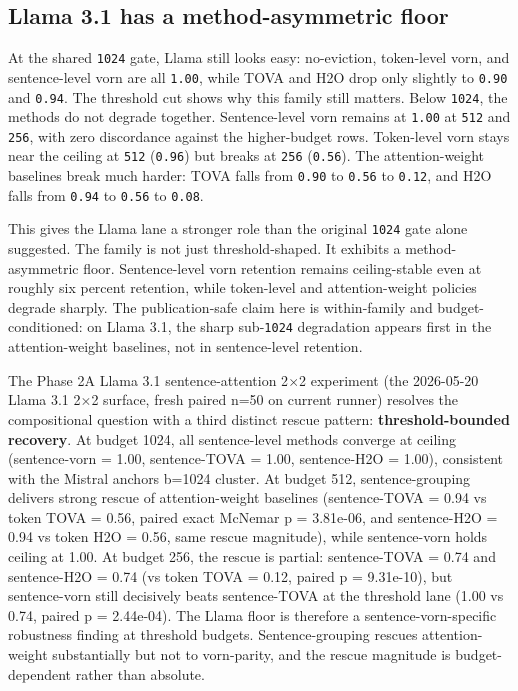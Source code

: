 \documentclass[10pt]{article}
\begin{document}
\subsection{Llama 3.1 has a method-asymmetric floor}\label{55-llama-31-has-a-method-asymmetric-floor}

At the shared \texttt{1024} gate, Llama still looks easy: no-eviction,
token-level vorn, and sentence-level vorn are all \texttt{1.00}, while
TOVA and H2O drop only slightly to \texttt{0.90} and
\texttt{0.94}. The threshold cut shows why this family still matters.
Below \texttt{1024}, the methods do not degrade together. Sentence-level
vorn remains at \texttt{1.00} at \texttt{512} and \texttt{256}, with
zero discordance against the higher-budget rows. Token-level vorn stays
near the ceiling at \texttt{512} (\texttt{0.96}) but breaks at
\texttt{256} (\texttt{0.56}). The attention-weight baselines break much
harder: TOVA falls from \texttt{0.90} to \texttt{0.56} to
\texttt{0.12}, and H2O falls from \texttt{0.94} to \texttt{0.56}
to \texttt{0.08}.

This gives the Llama lane a stronger role than the original
\texttt{1024} gate alone suggested. The family is not just
threshold-shaped. It exhibits a method-asymmetric floor. Sentence-level
vorn retention remains ceiling-stable even at roughly six
percent retention, while token-level and attention-weight policies
degrade sharply. The publication-safe claim here is within-family and
budget-conditioned: on Llama 3.1, the sharp sub-\texttt{1024}
degradation appears first in the attention-weight baselines, not in
sentence-level retention.

The Phase 2A Llama 3.1 sentence-attention 2$\times$2 experiment (the 2026-05-20
Llama 3.1 2$\times$2 surface, fresh paired n=50 on current runner) resolves the
compositional question with a third distinct rescue pattern:
\textbf{threshold-bounded recovery}. At budget 1024, all sentence-level
methods converge at ceiling (sentence-vorn = 1.00, sentence-TOVA =
1.00, sentence-H2O = 1.00), consistent with the Mistral
anchor\textquotesingle s b=1024 cluster. At budget 512,
sentence-grouping delivers strong rescue of attention-weight baselines
(sentence-TOVA = 0.94 vs token TOVA = 0.56, paired exact
McNemar p = 3.81e-06, and sentence-H2O = 0.94 vs token H2O =
0.56, same rescue magnitude), while sentence-vorn holds ceiling at 1.00.
At budget 256, the rescue is partial: sentence-TOVA = 0.74 and
sentence-H2O = 0.74 (vs token TOVA = 0.12, paired p =
9.31e-10), but sentence-vorn still decisively beats sentence-TOVA
at the threshold lane (1.00 vs 0.74, paired p = 2.44e-04). The Llama
floor is therefore a sentence-vorn-specific robustness finding at
threshold budgets. Sentence-grouping rescues attention-weight
substantially but not to vorn-parity, and the rescue magnitude is
budget-dependent rather than absolute.
\end{document}
